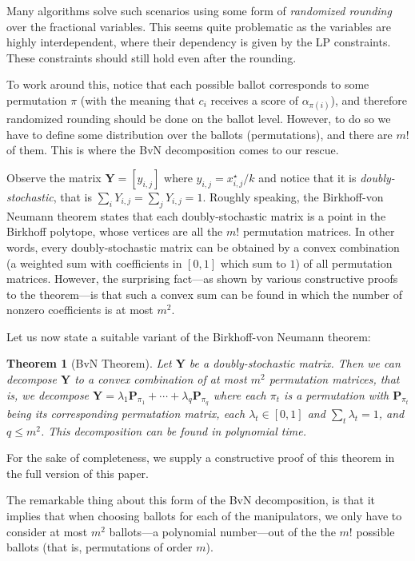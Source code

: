 \documentclass[letterpaper]{article} %
\newtheorem{theorem}{Theorem}
\theoremstyle{definition}
\newcommand\vecc{\mathbf}
\begin{document}
Many algorithms solve such scenarios using some form of \emph{randomized rounding} over the fractional variables. This seems quite problematic as the variables are highly interdependent, where their dependency is given by the LP constraints. These constraints  should still hold even after the rounding.

To work around this, notice that
each possible ballot corresponds to some permutation $\pi$ (with the meaning that $c_i$ receives a score of $\alpha_{\pi(i)}$), and therefore randomized rounding should be done on the ballot level. However, to do so we have to define some distribution over the ballots (permutations), and there are $m!$ of them. This is where the BvN decomposition comes to our rescue.

Observe the matrix $\vecc{Y}=[y_{i,j}]$ where $ y_{i,j}=x^\star_{i,j}/k$ and notice that it is \emph{doubly-stochastic}, that is $\sum_i Y_{i,j} = \sum_j Y_{i,j} = 1$.  Roughly speaking, the Birkhoff-von Neumann theorem states that each doubly-stochastic matrix is a point in the Birkhoff polytope, whose vertices are all the $m!$ permutation matrices.  In other words, every doubly-stochastic matrix can be obtained by a convex combination (a weighted sum with coefficients in $[0,1]$ which sum to $1$) of all permutation matrices. However, the surprising fact---as shown by various constructive proofs to the theorem---is that such a convex sum can be found in which the number of nonzero coefficients is at most $m^2$.

Let us now state a suitable variant of the Birkhoff-von Neumann theorem:
\begin{theorem}[BvN Theorem]\label{thr:bvn}
	Let $\vecc{Y}$ be a doubly-stochastic matrix. Then we can decompose $\vecc{Y}$ to a convex combination of at most $m^2$ permutation matrices, that is, we decompose $\vecc{Y} = \lambda_1 \vecc{P}_{\pi_1}+ \cdots + \lambda_q \vecc{P}_{\pi_q}$ where each $\pi_t$ is a permutation with  $\vecc{P}_{\pi_t}$ being its corresponding permutation matrix, each $\lambda_t \in [0,1]$ and $\sum_{t} \lambda_t = 1$, and $q \leq m^2$. This decomposition can be found in polynomial time.
\end{theorem}
For the sake of completeness, we supply a constructive proof of this theorem in the full version of this paper.


The remarkable thing about this form of the BvN decomposition, is that it implies that when choosing ballots for each of the manipulators, we only have to consider at most $m^2$ ballots---a polynomial number---out of the the $m!$ possible ballots (that is, permutations of order $m$).
\end{document}
